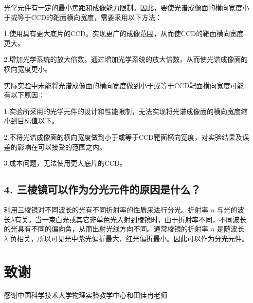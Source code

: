 \documentclass{ctexart}
\begin{document}
光学元件有一定的最小焦距和成像能力限制。因此，要使光谱成像面的横向宽度小于或等于CCD的靶面横向宽度，需要采用以下方法：

1.使用具有更大底片的CCD。实现更广的成像范围，从而使CCD的靶面横向宽度更大。

2.增加光学系统的放大倍数。通过增加光学系统的放大倍数，从而使光谱成像面的横向宽度更小。

实际实验中未能将光谱成像面的横向宽度做到小于或等于CCD靶面横向宽度可能有以下原因：

1.实验所采用的光学元件的设计和性能限制，无法实现将光谱成像面的横向宽度缩小到目标值以下。

2.不将光谱成像面的横向宽度做到小于或等于CCD靶面横向宽度，对实验结果及误差的影响在可以接受的范围之内。

3.成本问题，无法使用更大底片的CCD。

\subsection*{4. 三棱镜可以作为分光元件的原因是什么？}
利用三棱镜对不同波长的光有不同折射率的性质来进行分光。折射率 $n$ 与光的波长$\lambda$有关。当一束白光或其它非单色光入射到棱镜时，由于折射率不同，不同波长的光具有不同的偏向角，从而出射光线方向不同。通常棱镜的折射率 $n$ 是随波长 $\lambda$ 负相关，所以可见光中紫光偏折最大，红光偏折最小。因此可以作为分光元件。

\section*{致谢}
\begin{center}
	感谢中国科学技术大学物理实验教学中心和田佳冉老师
\end{center}


\label{unknown}
\end{document}
